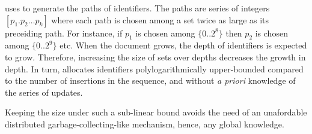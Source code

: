 \CRATE uses \LSEQ to generate the paths of identifiers. The paths are series of
integers $[p_1.p_2\ldots p_k]$ where each path is chosen among a set twice as
large as its preceiding path. For instance, if $p_1$ is chosen among
$\{0..2^8\}$ then $p_2$ is chosen among $\{0..2^9\}$ etc.  When the document
grows, the depth of identifiers is expected to grow. Therefore, increasing the
size of sets over depths decreases the growth in depth. In turn, \LSEQ allocates
identifiers polylogarithmically upper-bounded compared to the number of
insertions in the sequence, and without \emph{a priori} knowledge of the series
of updates.

Keeping the size under such a sub-linear bound avoids the need of an unafordable
distributed garbage-collecting-like mechanism, hence, any global knowledge.

